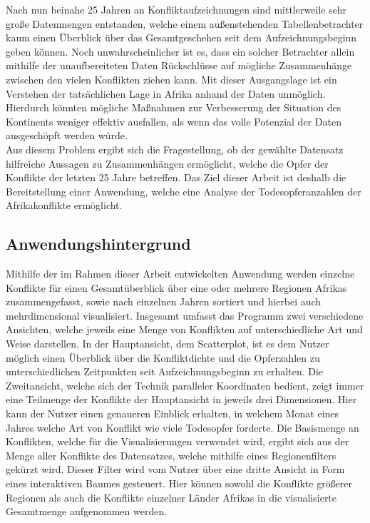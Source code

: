 \documentclass[usegeometry=true]{scrartcl}
\begin{document}
Nach nun beinahe 25 Jahren an Konfliktaufzeichnungen sind mittlerweile sehr große Datenmengen entstanden, welche einem außenstehenden Tabellenbetrachter kaum einen Überblick über das Gesamtgeschehen seit dem Aufzeichnungsbeginn geben können. Noch unwahrscheinlicher ist es, dass ein solcher Betrachter allein mithilfe der unaufbereiteten Daten Rückschlüsse auf mögliche Zusammenhänge zwischen den vielen Konflikten ziehen kann. Mit dieser Ausgangslage ist ein Verstehen der tatsächlichen Lage in Afrika anhand der Daten unmöglich. Hierdurch könnten mögliche Maßnahmen zur Verbesserung der Situation des Kontinents weniger effektiv ausfallen, als wenn das volle Potenzial der Daten ausgeschöpft werden würde.\\

Aus diesem Problem ergibt sich die Fragestellung, ob der gewählte Datensatz hilfreiche Aussagen zu Zusammenhängen ermöglicht, welche die Opfer der Konflikte der letzten 25 Jahre betreffen. Das Ziel dieser Arbeit ist deshalb die Bereitstellung einer Anwendung, welche eine Analyse der Todesopferanzahlen der Afrikakonflikte ermöglicht.

\subsection{Anwendungshintergrund}
Mithilfe der im Rahmen dieser Arbeit entwickelten Anwendung werden einzelne Konflikte für einen Gesamtüberblick über eine oder mehrere Regionen Afrikas zusammengefasst, sowie nach einzelnen Jahren sortiert und hierbei auch mehrdimensional visualisiert. Insgesamt umfasst das Programm zwei verschiedene Ansichten, welche jeweils eine Menge von Konflikten auf unterschiedliche Art und Weise darstellen. In der Hauptansicht, dem Scatterplot, ist es dem Nutzer möglich einen Überblick über die Konfliktdichte und die Opferzahlen zu unterschiedlichen Zeitpunkten seit Aufzeichnungsbeginn zu erhalten. Die Zweitansicht, welche sich der Technik paralleler Koordinaten bedient, zeigt immer eine Teilmenge der Konflikte der Hauptansicht in jeweils drei Dimensionen. Hier kann der Nutzer einen genaueren Einblick erhalten, in welchem Monat eines Jahres welche Art von Konflikt wie viele Todesopfer forderte. Die Basismenge an Konflikten, welche für die Visualisierungen verwendet wird, ergibt sich aus der Menge aller Konflikte des Datensatzes, welche mithilfe eines Regionenfilters gekürzt wird. Dieser Filter wird vom Nutzer über eine dritte Ansicht in Form eines interaktiven Baumes gesteuert. Hier können sowohl die Konflikte größerer Regionen als auch die Konflikte einzelner Länder Afrikas in die visualisierte Gesamtmenge aufgenommen werden.
\end{document}
